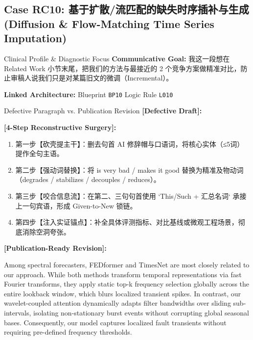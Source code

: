 \subsection{Case RC10: 基于扩散/流匹配的缺失时序插补与生成 (Diffusion \& Flow-Matching Time Series Imputation)}\label{case:RC10}
\begin{ConceptBox}{Clinical Profile \& Diagnostic Focus}
\textbf{Communicative Goal:} 我这一段想在 Related Work 小节末尾，把我们的方法与最接近的 2 个竞争方案做精准对比，防止审稿人说我们只是对某篇旧文的微调（Incremental）。\par
\textbf{Linked Architecture:} Blueprint \texttt{BP10} \enspace\textbar\enspace Logic Rule \texttt{L010}
\end{ConceptBox}
\begin{ExampleBox}{Defective Paragraph vs. Publication Revision}
\textbf{\color{TargetHighlight}[Defective Draft]:}\par
{}\par\vspace{6pt}
\textbf{\color{AcadForest}[4-Step Reconstructive Surgery]:}
\begin{enumerate}[label=\textbf{\color{AcadNavy}Step \arabic*:}, leftmargin=2em]
  \item 第一步【砍壳提主干】：删去句首 AI 修辞帽与口语词，将核心实体（≤5词）提作全句主语。
  \item 第二步【强动词替换】：将 is very bad / makes it good 替换为精准及物动词（degrades / stabilizes / decouples / reduces）。
  \item 第三步【咬合信息流】：在第二、三句句首使用 `This/Such + 汇总名词` 承接上一句宾语，形成 Given-to-New 锁链。
  \item 第四步【注入实证锚点】：补全具体评测指标、对比基线或微观工程场景，彻底消除空洞夸张。
\end{enumerate}\vspace{4pt}
\textbf{\color{AcadNavy}[Publication-Ready Revision]:}\par
Among spectral forecasters, FEDformer and TimesNet are most closely related to our approach. While both methods transform temporal representations via fast Fourier transforms, they apply static top-k frequency selection globally across the entire lookback window, which blurs localized transient spikes. In contrast, our wavelet-coupled attention dynamically adapts filter bandwidths over sliding sub-intervals, isolating non-stationary burst events without corrupting global seasonal bases. Consequently, our model captures localized fault transients without requiring pre-defined frequency thresholds.
\end{ExampleBox}
